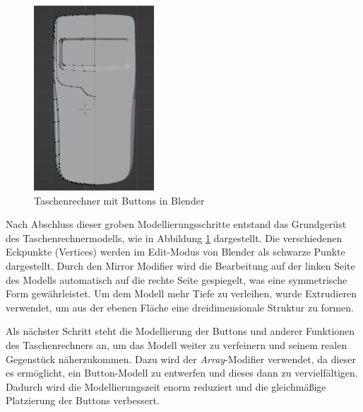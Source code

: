 \begin{figure}[H]
    \centering
    \includegraphics[width=0.4\textwidth]{images/basis.png}
    \caption{Taschenrechner mit Buttons in Blender}
    \label{fig:Basis}
\end{figure}

Nach Abschluss dieser groben Modellierungsschritte entstand das Grundgerüst des Taschenrechnermodells, wie in Abbildung \ref{fig:Basis} dargestellt. Die verschiedenen Eckpunkte (Vertices) werden im Edit-Modus von Blender als schwarze Punkte dargestellt. Durch den Mirror Modifier wird die Bearbeitung auf der linken Seite des Modells automatisch auf die rechte Seite gespiegelt, was eine symmetrische Form gewährleistet. Um dem Modell mehr Tiefe zu verleihen, wurde Extrudieren verwendet, um aus der ebenen Fläche eine dreidimensionale Struktur zu formen.


Als nächster Schritt steht die Modellierung der Buttons und anderer Funktionen des Taschenrechners an, um das Modell weiter zu verfeinern und seinem realen Gegenstück näherzukommen. Dazu wird der \textit{Array}-Modifier verwendet, da dieser es ermöglicht, ein Button-Modell zu entwerfen und dieses dann zu vervielfältigen. Dadurch wird die Modellierungszeit enorm reduziert und die gleichmäßige Platzierung der Buttons verbessert.


